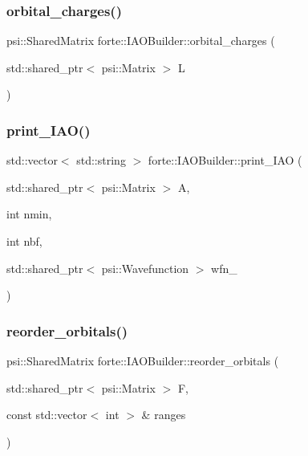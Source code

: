 \mbox{\label{classforte_1_1_i_a_o_builder_abb489fb8d722eac6991207c36ecd641d}} 
\subsubsection{\texorpdfstring{orbital\+\_\+charges()}{orbital\_charges()}}
{\footnotesize\ttfamily psi\+::\+Shared\+Matrix forte\+::\+I\+A\+O\+Builder\+::orbital\+\_\+charges (\begin{DoxyParamCaption}\item[{std\+::shared\+\_\+ptr$<$ psi\+::\+Matrix $>$}]{L }\end{DoxyParamCaption})}

\mbox{\label{classforte_1_1_i_a_o_builder_a84a908f7c130656827e368d2a9509561}} 
\subsubsection{\texorpdfstring{print\+\_\+\+I\+A\+O()}{print\_IAO()}}
{\footnotesize\ttfamily std\+::vector$<$ std\+::string $>$ forte\+::\+I\+A\+O\+Builder\+::print\+\_\+\+I\+AO (\begin{DoxyParamCaption}\item[{std\+::shared\+\_\+ptr$<$ psi\+::\+Matrix $>$}]{A,  }\item[{int}]{nmin,  }\item[{int}]{nbf,  }\item[{std\+::shared\+\_\+ptr$<$ psi\+::\+Wavefunction $>$}]{wfn\+\_\+ }\end{DoxyParamCaption})}

\mbox{\label{classforte_1_1_i_a_o_builder_a490572f40cf430c4f6df62f8dd9e1396}} 
\subsubsection{\texorpdfstring{reorder\+\_\+orbitals()}{reorder\_orbitals()}}
{\footnotesize\ttfamily psi\+::\+Shared\+Matrix forte\+::\+I\+A\+O\+Builder\+::reorder\+\_\+orbitals (\begin{DoxyParamCaption}\item[{std\+::shared\+\_\+ptr$<$ psi\+::\+Matrix $>$}]{F,  }\item[{const std\+::vector$<$ int $>$ \&}]{ranges }\end{DoxyParamCaption})}

